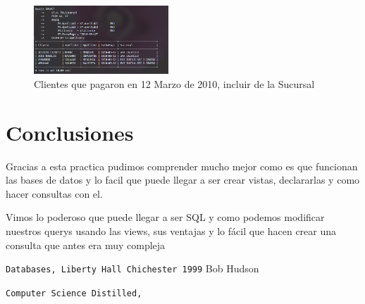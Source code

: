 \documentclass[12pt, fleqn]{article}                             %
\begin{document}
        \begin{figure}[ht!]
            \centering
            \includegraphics[width=0.45\textwidth]{BD5Reporte2Parte5}
            \caption{Clientes que pagaron en 12 Marzo de 2010, incluir de la Sucursal}
        \end{figure}





\clearpage
\section{Conclusiones}

    Gracias a esta practica pudimos comprender mucho mejor como es que funcionan las bases de datos
    y lo facil que puede llegar a ser crear vistas, declararlas y como hacer consultas con el.

    Vimos lo poderoso que puede llegar a ser SQL y como podemos modificar nuestros querys usando las 
    views, sus ventajas y lo fácil que hacen crear una consulta que antes era muy compleja




\begin{thebibliography}{9}

        \texttt{Databases, Liberty Hall Chichester 1999}
        Bob Hudson

        \texttt{Computer Science Distilled,}


     

\end{thebibliography}
\end{document}

